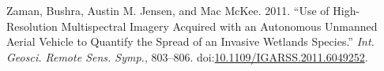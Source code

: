 \documentclass[]{interact}
\theoremstyle{plain}%
\theoremstyle{definition}
\theoremstyle{remark}
\begin{document}
\hypertarget{ref-zaman_use_2011}{}
Zaman, Bushra, Austin M. Jensen, and Mac McKee. 2011. ``Use of
High-Resolution Multispectral Imagery Acquired with an Autonomous
Unmanned Aerial Vehicle to Quantify the Spread of an Invasive Wetlands
Species.'' \emph{Int. Geosci. Remote Sens. Symp.}, 803--806.
doi:\href{https://doi.org/10.1109/IGARSS.2011.6049252}{10.1109/IGARSS.2011.6049252}.

\newpage
\singlespacing 
\end{document}

